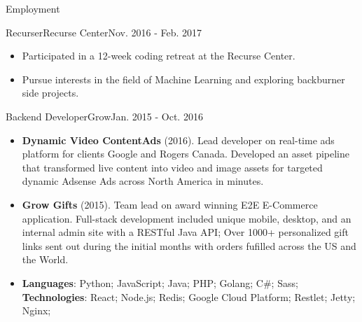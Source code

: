 \documentclass[]{mcdowellcv}
\begin{document}
    \makeheader

    \begin{cvsection}{Employment}

        \begin{cvsubsection}{Recurser}{Recurse Center}{Nov. 2016 - Feb. 2017}
            \begin{itemize}
                \item Participated in a 12-week coding retreat at the Recurse Center.
                \item Pursue interests in the field of Machine Learning and exploring backburner side projects.
            \end{itemize}
        \end{cvsubsection}

        \begin{cvsubsection}{Backend Developer}{Grow}{Jan. 2015 - Oct. 2016}
            \begin{itemize}
                \item \textbf{Dynamic Video ContentAds} (2016). Lead developer on real-time ads platform for clients Google and Rogers Canada. Developed an asset pipeline that transformed live content into video and image assets for targeted dynamic Adsense Ads across North America in minutes.
            \end{itemize}
            \begin{itemize}
                \item \textbf{Grow Gifts} (2015). Team lead on award winning E2E E-Commerce application. Full-stack development included unique mobile, desktop, and an internal admin site with a RESTful Java API; Over 1000+ personalized gift links sent out during the initial months with orders fufilled across the US and the World.
            \end{itemize}
            \begin{itemize}
                 \item \textbf{Languages}: Python; JavaScript; Java; PHP; Golang; C\#; Sass; \newline
                \textbf{Technologies}: React; Node.js; Redis; Google Cloud Platform; Restlet; Jetty; Nginx;
            \end{itemize}
        \end{cvsubsection}


\end{cvsection}
\end{document}
